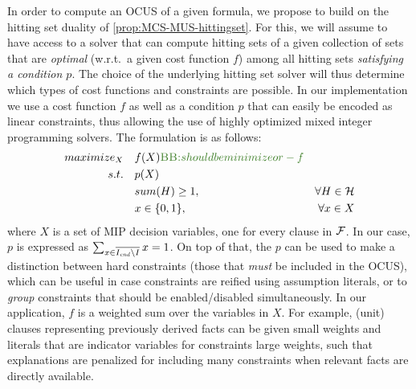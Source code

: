 In order to compute an OCUS of a given formula, we propose to build on the hitting set duality of \cref{prop:MCS-MUS-hittingset}. 
For this, we will assume to have access to a solver \cohs that can compute hitting sets of a given collection of sets that are \emph{optimal} (w.r.t.\ a given cost function $f$) among all hitting sets \emph{satisfying a condition $p$}. 
The choice of the underlying hitting set solver will thus determine which types of cost functions and constraints are possible. 
In our implementation we use a cost function $f$ as well as a condition $p$ that can easily be encoded as linear constraints, thus allowing the use of highly optimized mixed integer programming solvers. The \cohs formulation is as follows:
{\small
\begin{align*}
  maximize_X \quad & f(X) \bart{should be minimize or -f}\\ 
  s.t. \quad & p(X) \\
       & sum(H) \geq 1, \quad &\forall H \in \setstohit \\
       & x \in \{0,1\}, \quad &\forall x \in X
\end{align*}}
where $X$ is a set of MIP decision variables, one for every clause in $\mathcal{F} $. In our case, $p$ is expressed as $\sum_{x \in \overline{I_\mathit{end} \setminus I}} x = 1$. 
On top of that, the $p$ can be used to make a distinction between hard constraints (those that \emph{must} be included in the OCUS), which can be useful in case constraints are reified using assumption literals, or to \emph{group} constraints that should be enabled/disabled simultaneously. 
In our application, $f$ is a weighted sum over the variables in $X$. For example, (unit) clauses representing previously derived facts can be given small weights and literals that are indicator variables for constraints large weights, such that explanations are penalized for including many constraints when relevant facts are directly available.



